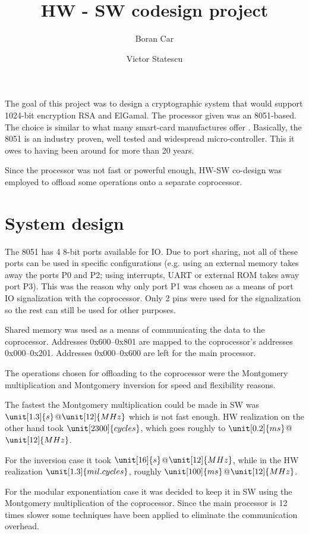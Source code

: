 \documentclass[a4paper, 12pt]{article}
\title{HW - SW codesign project}
\author{Boran Car \and Victor Statescu}
\begin{document}
\maketitle

The goal of this project was to design a cryptographic system that
would support 1024-bit encryption RSA and ElGamal. The processor given
was an 8051-based. The choice is similar to what many smart-card
manufactures offer \cite{smartcard_crypto_coprocs,
  smartcard_crypto_coprocs2}. Basically, the 8051 is an industry
proven, well tested and widespread micro-controller. This it owes to
having been around for more than 20 years.

Since the processor was not fast or powerful enough, HW-SW co-design
was employed to offload some operations onto a separate coprocessor.

\section{System design}

The 8051 has 4 8-bit ports available for IO. Due to port sharing, not
all of these ports can be used in specific configurations (e.g. using
an external memory takes away the ports P0 and P2; using interrupts,
UART or external ROM takes away port P3). This was the reason why only
port P1 was chosen as a means of port IO signalization with the
coprocessor. Only 2 pins were used for the signalization so the rest
can still be used for other purposes.  

Shared memory was used as a means of communicating the data to the
coprocessor.  Addresses 0x600--0x801 are mapped to the coprocessor's
addresses 0x000--0x201. Addresses 0x000--0x600 are left for the main
processor.

The operations chosen for offloading to the coprocessor were the
Montgomery multiplication and Montgomery inversion for speed and
flexibility reasons.

The fastest the Montgomery multiplication could be made in SW was
$\unit[1.3]{s}$@$\unit[12]{MHz}$ which is not fast enough. HW
realization on the other hand took $\unit[2300]{cycles}$, which goes
roughly to $\unit[0.2]{ms}$@$\unit[12]{MHz}$.

For the inversion case it took $\unit[16]{s}$@$\unit[12]{MHz}$, while
in the HW realization $\unit[1.3]{mil. cycles}$, roughly
$\unit[100]{ms}$@$\unit[12]{MHz}$.

For the modular exponentiation case it was decided to keep it in SW
using the Montgomery multiplication of the coprocessor. Since the main
processor is 12 times slower some techniques have been applied to
eliminate the communication overhead.
\end{document}
